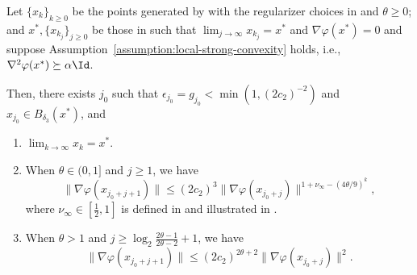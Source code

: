 \begin{proposition}
    \label{prop:mixed-newton-nonconvex-phase-local-rates}
    Let $\{ x_k \}_{k \ge 0}$ be the points generated by  with the regularizer choices in  and $\theta \geq 0$;
    and $x^*, \{x_{k_j}\}_{j \geq 0}$ be those in  such that $\lim_{j \to \infty} x_{k_j} = x^*$ and $\nabla\varphi(x^*) = 0$ and suppose Assumption~\ref{assumption:local-strong-convexity} holds, i.e., $\nabla^2\varphi(x^*) \succeq \alpha \Id$.

    Then, there exists $j_0$ such that $\epsilon_{j_0} = g_{j_0} < \min(1, (2c_2)^{-2})$ and $x_{j_0} \in B_{\delta_3}(x^*)$, and
    \begin{enumerate}
        \item  $\lim_{k \to \infty} x_k = x^*$.
        \item When $\theta \in (0, 1]$ and $j \geq 1$, we have
        \begin{equation*}
            \| \nabla \varphi(x_{j_0+j+1}) \| \leq 
            (2c_2)^3 \| \nabla \varphi(x_{j_0+j}) \|^{1 + \nu_\infty - (4\theta/9)^k},
        \end{equation*}
        where $\nu_\infty \in \left [\frac{1}{2}, 1\right ]$ is defined in  and illustrated in .
        \item When $\theta > 1$ and $j \geq \log_2\frac{2\theta - 1}{2\theta - 2} + 1$, we have
        \begin{equation*}
            \| \nabla \varphi(x_{j_0+j+1}) \| \leq 
            (2c_2)^{2\theta + 2} \| \nabla \varphi(x_{j_0+j}) \|^{2}.
        \end{equation*}
    \end{enumerate}
\end{proposition}
